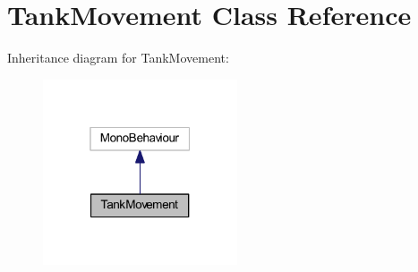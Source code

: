 \hypertarget{class_tank_movement}{}\section{Tank\+Movement Class Reference}
\label{class_tank_movement}


Inheritance diagram for Tank\+Movement\+:
\nopagebreak
\begin{figure}[H]
\begin{center}
\leavevmode
\includegraphics[width=163pt]{class_tank_movement__inherit__graph}
\end{center}
\end{figure}

